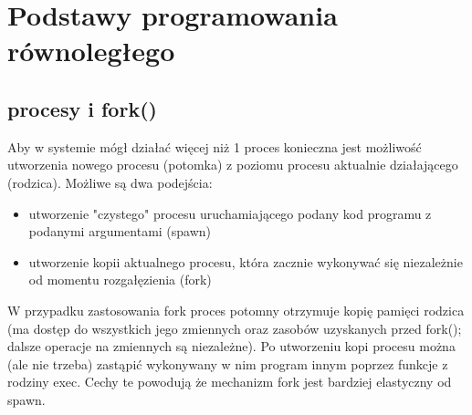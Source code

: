 % 
% 
% 
% 

\section{Podstawy programowania równoległego}

\subsection{procesy i fork()}

Aby w systemie mógł działać więcej niż 1 proces konieczna jest możliwość utworzenia nowego procesu (potomka) z poziomu procesu aktualnie działającego (rodzica). Możliwe są dwa podejścia:
\begin{itemize}
	\item utworzenie "czystego" procesu uruchamiającego podany kod programu z podanymi argumentami (spawn)
	\item utworzenie kopii aktualnego procesu, która zacznie wykonywać się niezależnie od momentu rozgałęzienia (fork)
\end{itemize}
W przypadku zastosowania fork proces potomny otrzymuje kopię pamięci rodzica (ma dostęp do wszystkich jego zmiennych oraz zasobów uzyskanych przed fork(); dalsze operacje na zmiennych są niezależne). Po utworzeniu kopi procesu można (ale nie trzeba) zastąpić wykonywany w nim program innym poprzez funkcje z rodziny exec. Cechy te powodują że mechanizm fork jest bardziej elastyczny od spawn.

